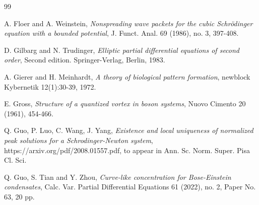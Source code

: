 \documentclass[10pt, reqno]{amsart}
\numberwithin{equation}{section}
\theoremstyle{definition}
\begin{document}
{\begin{thebibliography}{99}










 A. Floer and A. Weinstein,
 \emph{Nonspreading wave packets for the cubic Schr\"odinger equation with a bounded potential},
 J. Funct. Anal.
 69 (1986), no. 3, 397-408.

D. Gilbarg and N. Trudinger,
\emph{Elliptic partial differential equations of second order}, Second edition. Springer-Verlag, Berlin, 1983.



A. Gierer and H. Meinhardt,
\emph{A theory of biological pattern formation},
newblock Kybernetik 12(1):30-39, 1972.



E. Gross,
\emph{Structure of a quantized vortex in boson systems},
Nuovo Cimento
20 (1961), 454-466.


 Q. Guo, P. Luo, C. Wang, J. Yang,
\emph{ Existence and local uniqueness of normalized peak solutions for a Schrodinger-Newton system},
https://arxiv.org/pdf/2008.01557.pdf, to appear in Ann. Sc. Norm. Super. Pisa Cl. Sci.


Q. Guo, S. Tian and Y. Zhou,
\emph{Curve-like concentration for Bose-Einstein condensates},
Calc. Var. Partial Differential Equations
61 (2022), no. 2, Paper No. 63, 20 pp.


\end{thebibliography}}
\end{document}

